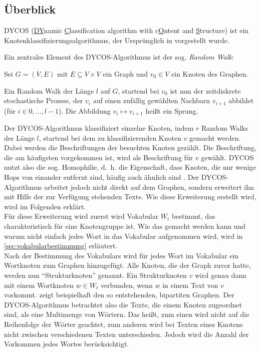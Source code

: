 \subsection{Überblick}
DYCOS (\underline{DY}namic \underline{C}lassification 
algorithm with c\underline{O}ntent and \underline{S}tructure) ist ein 
Knotenklassifizierungsalgorithmus, der Ursprünglich in \cite{aggarwal2011} vorgestellt 
wurde.

Ein zentrales Element des DYCOS-Algorithmus ist der sog.
{\it Random Walk}:

\begin{definition}
    Sei $G = (V, E)$ mit $E \subseteq V \times V$ ein Graph und 
    $v_0 \in V$ ein Knoten des Graphen.


    Ein Random Walk der Länge $l$ auf $G$, startend bei $v_0$ ist
    nun der zeitdiskrete stochastische Prozess, der $v_i$
    auf einen zufällig gewählten Nachbarn $v_{i+1}$ abbildet 
    (für $i \in 0, \dots, l-1$).
    Die Abbildung $v_i \mapsto v_{i+1}$ heißt ein Sprung.
\end{definition}

Der DYCOS-Algorithmus klassifiziert einzelne Knoten, indem $r$ Random Walks der Länge $l$,
startend bei dem zu klassifizierenden Knoten $v$ gemacht werden. Dabei
werden die Beschriftungen der besuchten Knoten gezählt. Die Beschriftung, die am häufigsten
vorgekommen ist, wird als Beschriftung für $v$ gewählt.
DYCOS nutzt also die sog. Homophilie, d.~h. die Eigenschaft, dass
Knoten, die nur wenige Hops von einander entfernt sind, häufig auch
ähnlich sind \cite{bhagat}. Der DYCOS-Algorithmus arbeitet jedoch nicht 
direkt auf dem Graphen, sondern erweitert ihn mit 
Hilfe der zur Verfügung stehenden Texte. Wie diese Erweiterung 
erstellt wird, wird im Folgenden erklärt.\\
Für diese Erweiterung wird zuerst wird Vokabular $W_t$ bestimmt, das 
charakteristisch für eine Knotengruppe ist. Wie das gemacht werden kann
und warum nicht einfach jedes Wort in das Vokabular aufgenommen wird,
wird in \cref{sec:vokabularbestimmung} erläutert.\\
Nach der Bestimmung des Vokabulars wird für 
jedes Wort im Vokabular ein Wortknoten zum Graphen hinzugefügt. Alle
Knoten, die der Graph zuvor hatte, werden nun \enquote{Strukturknoten}
genannt.
Ein Strukturknoten $v$ wird genau dann mit einem Wortknoten $w \in W_t$
verbunden, wenn $w$ in einem Text von $v$ vorkommt. 
zeigt beispielhaft den so entstehenden, bipartiten Graphen.
Der DYCOS-Algorithmus betrachtet also die Texte, die einem Knoten 
zugeordnet sind, als eine Multimenge von Wörtern. Das heißt, zum einen 
wird nicht auf die Reihenfolge der Wörter geachtet, zum anderen wird 
bei Texten eines Knotens nicht zwischen verschiedenen 
Texten unterschieden. Jedoch wird die Anzahl der Vorkommen 
jedes Wortes berücksichtigt.


